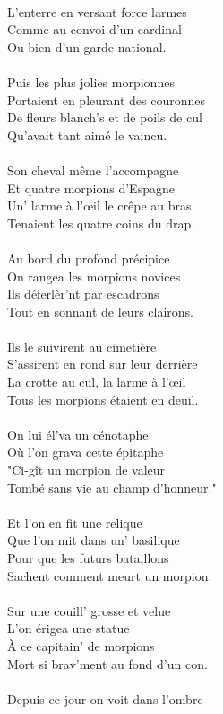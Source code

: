 \\L'enterre en versant force larmes
\\Comme au convoi d'un cardinal
\\Ou bien d'un garde national.
\\\\Puis les plus jolies morpionnes
\\Portaient en pleurant des couronnes
\\De fleurs blanch's et de poils de cul
\\Qu'avait tant aimé le vaincu.
\\\\Son cheval même l'accompagne
\\Et quatre morpions d'Espagne
\\Un' larme à l'œil le crêpe au bras
\\Tenaient les quatre coins du drap.
\\\\Au bord du profond précipice
\\On rangea les morpions novices
\\Ils déferlèr'nt par escadrons
\\Tout en sonnant de leurs clairons.
\\\\Ils le suivirent au cimetière
\\S'assirent en rond sur leur derrière
\\La crotte au cul, la larme à l'œil
\\Tous les morpions étaient en deuil.
\\\\On lui él'va un cénotaphe
\\Où l'on grava cette épitaphe
\\"Ci-gît un morpion de valeur
\\Tombé sans vie au champ d'honneur."
\\\\Et l'on en fit une relique
\\Que l'on mit dans un' basilique
\\Pour que les futurs bataillons
\\Sachent comment meurt un morpion.
\\\\Sur une couill' grosse et velue
\\L'on érigea une statue
\\À ce capitain' de morpions
\\Mort si brav'ment au fond d'un con.
\breakpage
\\\\Depuis ce jour on voit dans l'ombre

